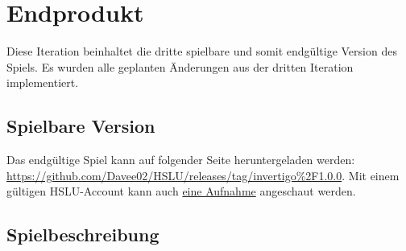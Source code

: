 \documentclass{article}
\begin{document}
\newpage
\section{Endprodukt}

Diese Iteration beinhaltet die dritte spielbare und somit endgültige Version des Spiels. Es wurden alle geplanten Änderungen aus der dritten Iteration implementiert.

\subsection{Spielbare Version}
 
Das endgültige Spiel kann auf folgender Seite heruntergeladen werden: \url{https://github.com/Davee02/HSLU/releases/tag/invertigo%2F1.0.0}.
Mit einem gültigen HSLU-Account kann auch \href{https://hsluzern-my.sharepoint.com/:v:/g/personal/david_hodel_stud_hslu_ch/EX3T2xgSuBZCghjt5XcuOzQBevE-ReQYlXj5H_SDUirOFg?nav=eyJyZWZlcnJhbEluZm8iOnsicmVmZXJyYWxBcHAiOiJPbmVEcml2ZUZvckJ1c2luZXNzIiwicmVmZXJyYWxBcHBQbGF0Zm9ybSI6IldlYiIsInJlZmVycmFsTW9kZSI6InZpZXciLCJyZWZlcnJhbFZpZXciOiJNeUZpbGVzTGlua0NvcHkifX0&e=mWlCaB}{eine Aufnahme}
angeschaut werden.

\subsection{Spielbeschreibung}
\end{document}
